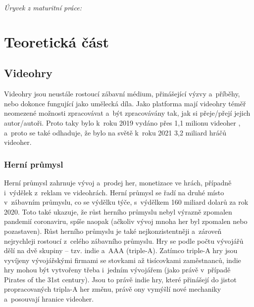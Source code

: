 \documentclass[a4paper]{extarticle}
\begin{document}


\setcounter{page}{3}
\setcounter{section}{1}
\textit{Úryvek z maturitní práce:}
\section{Teoretická část}
\subsection{Videohry}
Videohry jsou neustále rostoucí zábavní médium, přinášející výzvy a~příběhy, nebo dokonce fungující jako umělecká díla. Jako platforma mají videohry téměř neomezené možnosti zpracovávat a~být zpracovávány tak, jak si přeje/přejí jejich autor/autoři. Proto taky bylo k~roku 2019 vydáno přes 1,1 milionu videoher \cite{games_number}, a~proto se také odhaduje, že bylo na světě k~roku 2021 3,2 miliard hráčů videoher. \cite{gamers}
\subsubsection{Herní průmysl}
Herní průmysl zahrnuje vývoj a~prodej her, monetizace ve hrách, případně i~výdělek z~reklam ve videohrách.
Herní průmysl se řadí na druhé místo v~zábavním průmyslu, co se výdělku týče, s~výdělkem 160 miliard dolarů za rok 2020. \cite{media_revenue} Toto také ukazuje, že růst herního průmyslu nebyl výrazně zpomalen pandemií coronaviru, spíše naopak (ačkoliv vývoj mnoha her byl zpomalen nebo pozastaven). Růst herního průmyslu je také nejkonzistentněji a~zároveň nejrychleji rostoucí z~celého zábavního průmyslu.
Hry se podle počtu vývojářů dělí na dvě skupiny – tzv. indie a~AAA (triple-A). Zatímco triple-A hry jsou vyvíjeny vývojářskými firmami se stovkami až tisícovkami zaměstnanců, indie hry mohou být vytvořeny třeba i~jedním vývojářem (jako právě v~případě Pirates of the 31st century). Jsou to právě indie hry, které přinášejí do jistot propracovaných tripla-A her změnu, právě ony vymýšlí nové mechaniky a~posouvají hranice videoher.
\end{document}
